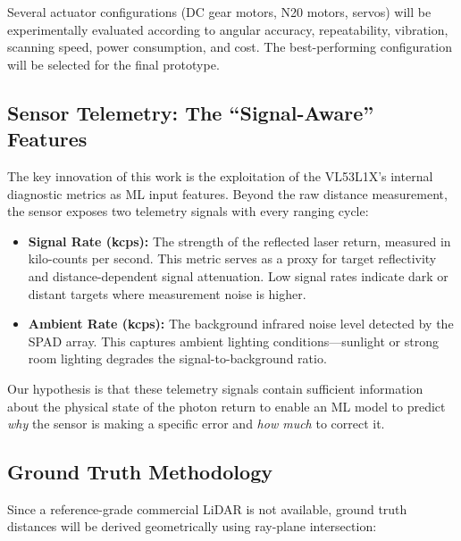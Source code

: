 \documentclass[12pt,a4paper]{article}
\begin{document}
    Several actuator configurations (DC gear motors, N20 motors, servos) will be experimentally evaluated according to angular accuracy, repeatability, vibration, scanning speed, power consumption, and cost. The best-performing configuration will be selected for the final prototype.


    \subsection{Sensor Telemetry: The ``Signal-Aware'' Features}

    The key innovation of this work is the exploitation of the VL53L1X's internal diagnostic metrics as ML input features. Beyond the raw distance measurement, the sensor exposes two telemetry signals with every ranging cycle:

    \begin{itemize}[leftmargin=0.35in]
        \item \textbf{Signal Rate (kcps):} The strength of the reflected laser return, measured in kilo-counts per second. This metric serves as a proxy for target reflectivity and distance-dependent signal attenuation. Low signal rates indicate dark or distant targets where measurement noise is higher.
        \item \textbf{Ambient Rate (kcps):} The background infrared noise level detected by the SPAD array. This captures ambient lighting conditions---sunlight or strong room lighting degrades the signal-to-background ratio.
    \end{itemize}

    Our hypothesis is that these telemetry signals contain sufficient information about the physical state of the photon return to enable an ML model to predict \textit{why} the sensor is making a specific error and \textit{how much} to correct it.


    \subsection{Ground Truth Methodology}

    Since a reference-grade commercial LiDAR is not available, ground truth distances will be derived geometrically using ray-plane intersection:
\end{document}
